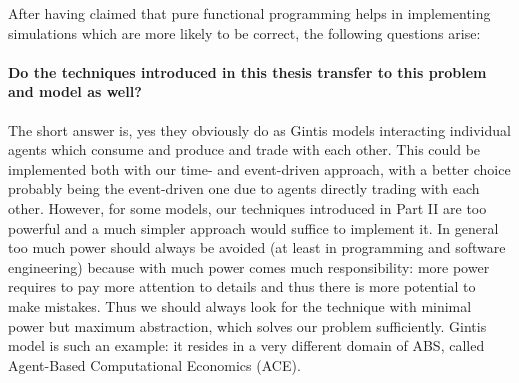 After having claimed that pure functional programming helps in implementing simulations which are more likely to be correct, the following questions arise:

\paragraph{Do the techniques introduced in this thesis transfer to this problem and model as well?}
The short answer is, yes they obviously do as Gintis models interacting individual agents which consume and produce and trade with each other. This could be implemented both with our time- and event-driven approach, with a better choice probably being the event-driven one due to agents directly trading with each other. However, for some models, our techniques introduced in Part II are too powerful and a much simpler approach would suffice to implement it. In general too much power should always be avoided (at least in programming and software engineering) because with much power comes much responsibility: more power requires to pay more attention to details and thus there is more potential to make mistakes. Thus we should always look for the technique with minimal power but maximum abstraction, which solves our problem sufficiently. Gintis model is such an example: it resides in a very different domain of ABS, called Agent-Based Computational Economics (ACE).

